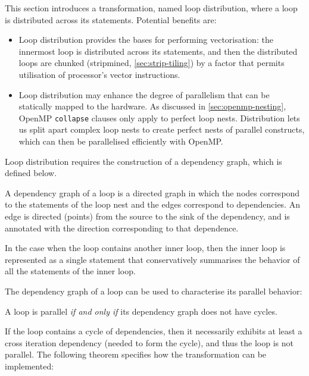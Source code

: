 This section introduces a transformation, named loop distribution,
where a loop is distributed across its statements.  Potential benefits
are:
\begin{itemize}
\item Loop distribution provides the bases for performing
  vectorisation: the innermost loop is distributed across its
  statements, and then the distributed loops are chunked (stripmined,
  \cref{sec:strip-tiling}) by a factor that permits utilisation of
  processor's vector instructions.
\item Loop distribution may enhance the degree of parallelism that can
  be statically mapped to the hardware.  As discussed in
  \cref{sec:openmp-nesting}, OpenMP \texttt{collapse} clauses only
  apply to perfect loop nests.  Distribution lets us split apart
  complex loop nests to create perfect nests of parallel constructs,
  which can then be parallelised efficiently with OpenMP.
\end{itemize}

Loop distribution requires the construction of a dependency graph,
which is defined below.

\begin{definition}\label{Dep-Graph}
  A dependency graph of a loop is a directed graph in which
  the nodes correspond to the statements of the loop nest and the
  edges correspond to dependencies. An edge is directed (points)
  from the source to the sink of the dependency, and is annotated
  with the direction corresponding to that dependence.

  In the case when the loop contains another inner loop, then
  the inner loop is represented as a single statement that conservatively
  summarises the behavior of all the statements of the inner loop.
\end{definition}

The dependency graph of a loop can be used to characterise its
parallel behavior:
\begin{theorem}\label{Dep-Cycle}
  A loop is parallel \emph{if and only if} its dependency graph does
  not have cycles.
\end{theorem}
If the loop contains a cycle of dependencies, then it necessarily
exhibits at least a cross iteration dependency (needed to form the
cycle), and thus the loop is not parallel.  The following theorem
specifies how the transformation can be implemented:

